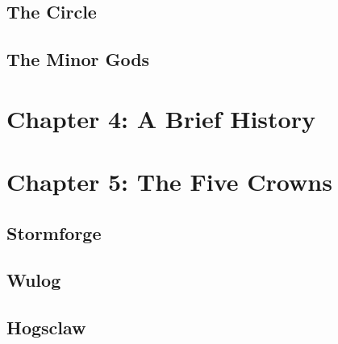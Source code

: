 \documentclass[10pt,twoside,twocolumn,openany]{book}
\begin{document}
		\section{The Circle}
		\section{The Minor Gods}
	\chapter{Chapter 4: A Brief History}
	\chapter{Chapter 5: The Five Crowns}
		\section{Stormforge}
		\section{Wulog}
		\section{Hogsclaw}
	
	
\end{document}
